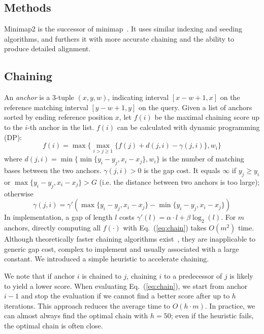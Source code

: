 \documentclass{bioinfo}
\begin{document}
\begin{methods}
\section{Methods}

Minimap2 is the successor of minimap~\citep{Li:2016aa}. It uses similar
indexing and seeding algorithms, and furthers it with more accurate chaining
and the ability to produce detailed alignment.

\subsection{Chaining}

An \emph{anchor} is a 3-tuple $(x,y,w)$, indicating interval $[x-w+1,x]$ on the
reference matching interval $[y-w+1,y]$ on the query. Given a list of anchors
sorted by ending reference position $x$, let $f(i)$ be the maximal chaining
score up to the $i$-th anchor in the list. $f(i)$ can be calculated with
dynamic programming (DP):
\begin{equation}\label{eq:chain}
f(i)=\max\big\{\max_{i>j\ge 1} \{ f(j)+d(j,i)-\gamma(j,i) \},w_i\big\}
\end{equation}
where $d(j,i)=\min\big\{\min\{y_i-y_j,x_i-x_j\},w_i\big\}$ is the number of
matching bases between the two anchors. $\gamma(j,i)>0$ is the gap cost. It
equals $\infty$ if $y_j\ge y_i$ or $\max\{y_i-y_j,x_i-x_j\}>G$ (i.e. the
distance between two anchors is too large); otherwise
\[
\gamma(j,i)=\gamma'(\max\{y_i-y_j,x_i-x_j\}-\min\{y_i-y_j,x_i-x_j\})
\]
In implementation, a gap of length $l$ costs $\gamma'(l)=\alpha\cdot
l+\beta\log_2(l)$. For $m$ anchors, directly computing all $f(\cdot)$ with
Eq.~(\ref{eq:chain}) takes $O(m^2)$ time. Although theoretically faster
chaining algorithms exist~\citep{Abouelhoda:2005aa}, they
are inapplicable to generic gap cost, complex to implement and usually
associated with a large constant. We introduced a simple heuristic to
accelerate chaining.

We note that if anchor $i$ is chained to $j$, chaining $i$ to a predecessor
of $j$ is likely to yield a lower score. When evaluating Eq.~(\ref{eq:chain}),
we start from anchor $i-1$ and stop the evaluation if we cannot find a better
score after up to $h$ iterations. This approach reduces the average time to
$O(h\cdot m)$. In practice, we can almost always find the optimal chain with
$h=50$; even if the heuristic fails, the optimal chain is often close.


\end{methods}
\end{document}
